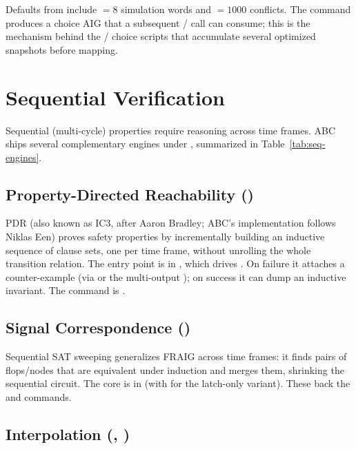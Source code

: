 Defaults from  include ${=}8$ simulation
words and ${=}1000$ conflicts. The command  produces a
choice AIG that a subsequent / call can consume; this is the
mechanism behind the / choice scripts that
accumulate several optimized snapshots before mapping.

\section{Sequential Verification}

Sequential (multi-cycle) properties require reasoning across time frames. ABC
ships several complementary engines under , summarized in
Table~\ref{tab:seq-engines}.

\subsection{Property-Directed Reachability ()}

PDR (also known as IC3, after Aaron Bradley; ABC's implementation follows
Niklas Een) proves safety properties by incrementally building an inductive
sequence of clause sets, one per time frame, without unrolling the whole
transition relation. The entry point is  in
, which drives . On failure
it attaches a counter-example (via  or the multi-output
); on success it can dump an inductive invariant. The command is
.

\subsection{Signal Correspondence ()}

Sequential SAT sweeping generalizes FRAIG across time frames: it finds pairs of
flops/nodes that are equivalent under induction and merges them, shrinking the
sequential circuit. The core is  in
 (with  for the
latch-only variant). These back the  and  commands.

\subsection{Interpolation (, )}

